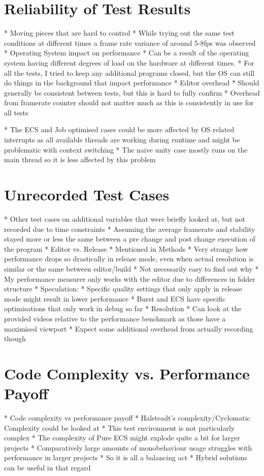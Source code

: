 \section{Reliability of Test Results}
      * Moving pieces that are hard to control
          * While trying out the same test conditions at different times a frame rate variance of around 5-8fps was observed
          * Operating System impact on performance
             * Can be a result of the operating system having different degrees of load on the hardware at different times.
             * For all the tests, I tried to keep any additional programs closed, but the OS can still do things in the background that impact performance
          * Editor overhead
             * Should generally be consistent between tests, but this is hard to fully confirm
      * Overhead from framerate counter should not matter much as this is consistently in use for all tests
      
      * The ECS and Job optimised cases could be more affected by OS related interrupts as all available threads are working during runtime and might be problematic with context switching
      * The naive unity case mostly runs on the main thread so it is less affected by this problem

\section{Unrecorded Test Cases}
   * Other test cases on additional variables that were briefly looked at, but not recorded due to time constraints 
      * Assuming the average framerate and stability stayed more or less the same between a pre change and post change execution of the program
   * Editor vs. Release
      * Mentioned in Methods
      * Very strange how performance drops so drastically in release mode, even when actual resolution is similar or the same between editor/build
      * Not necessarily easy to find out why
         * My performance measurer only works with the editor due to differences in folder structure
      * Speculation: 
         * Specific quality settings that only apply in release mode might result in lower performance
         * Burst and ECS have specific optimisations that only work in debug so far
   * Resolution
      * Can look at the provided videos relative to the performance benchmark as those have a maximised viewport
      * Expect some additional overhead from actually recording though
   
\section{Code Complexity vs. Performance Payoff}
   * Code complexity vs performance payoff
       * Halsteadt's complexity/Cyclomatic Complexity could be looked at
   * This test environment is not particularly complex
      * The complexity of Pure ECS might explode quite a bit for larger projects
         * Comparatively large amounts of monobehaviour usage struggles with performance in larger projects
         * So it is all a balancing act
      * Hybrid solutions can be useful in that regard
   
